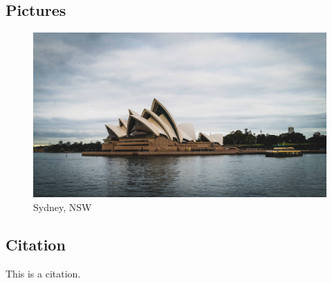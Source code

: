 \documentclass{article}
\begin{document}
\subsection{Pictures}

\begin{figure}[htbp]
	\center
	\includegraphics[scale=0.06]{img/photo.jpg}
	\caption{Sydney, NSW}
\end{figure}

\subsection{Citation}

This is a citation\cite{Eg}.

\newpage





\end{document}
